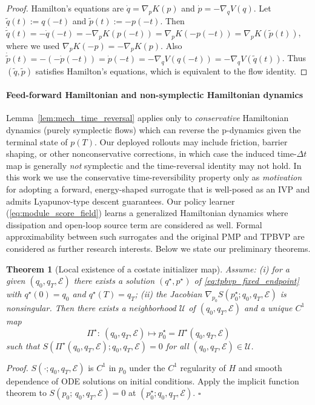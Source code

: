 \documentclass{article} %
\newtheorem{theorem}{Theorem}[section]     %
\begin{document}
\begin{proof}
Hamilton's equations are $\dot q=\nabla_p K(p)$ and $\dot p=-\nabla_q V(q)$.
Let $\tilde q(t):=q(-t)$ and $\tilde p(t):=-p(-t)$.
Then $\dot{\tilde q}(t)=-\dot q(-t)=-\nabla_p K(p(-t))=\nabla_p K(-p(-t))=\nabla_p K(\tilde p(t))$,
where we used $\nabla_p K(-p)=-\nabla_p K(p)$.
Also $\dot{\tilde p}(t)=-(-\dot p(-t))=\dot p(-t)=-\nabla_q V(q(-t))=-\nabla_q V(\tilde q(t))$. Thus $(\tilde q,\tilde p)$ satisfies Hamilton's equations, which is equivalent to the flow identity.
\end{proof}

\paragraph{ Feed-forward Hamiltonian and non-symplectic Hamiltonian dynamics}
Lemma~\ref{lem:mech_time_reversal} applies only to \emph{conservative} Hamiltonian dynamics (purely symplectic flows) which can reverse the p-dynamics given the terminal state of $p(T)$. Our deployed rollouts may include friction, barrier shaping, or other nonconservative corrections, in which case the induced
time-$\Delta t$ map is generally \emph{not} symplectic and the time-reversal identity may not hold.
In this work we use the conservative time-reversibility property only as \emph{motivation} for adopting a forward,
energy-shaped surrogate that is well-posed as an IVP and admits
Lyapunov-type descent guarantees. Our policy learner (\cref{eq:module_score_field}) learns a generalized Hamiltonian dynamics where dissipation and open-loop source term are considered as well. Formal approximability between such surrogates and the original PMP and TPBVP are considered as further research interests. Below we state our preliminary theorems.

\begin{theorem}[Local existence of a costate initializer map]
\label{thm:ift_costate}
Assume: (i) for a given $(q_0,q_T,\mathcal E)$ there exists a solution $(q^\star,p^\star)$ of \cref{eq:tpbvp_fixed_endpoint}
with $q^\star(0)=q_0$ and $q^\star(T)=q_T$;
(ii) the Jacobian $\nabla_{p_0}S(p_0^\star;q_0,q_T,\mathcal E)$ is nonsingular.
Then there exists a neighborhood $\mathcal U$ of $(q_0,q_T,\mathcal E)$ and a unique $C^1$ map
\[
\Pi^\star:\ (q_0,q_T,\mathcal E)\mapsto p_0^\star=\Pi^\star(q_0,q_T,\mathcal E)
\]
such that $S(\Pi^\star(q_0,q_T,\mathcal E);q_0,q_T,\mathcal E)=0$ for all $(q_0,q_T,\mathcal E)\in\mathcal U$.
\end{theorem}
\emph{Proof.} $S(\cdot;q_0,q_T,\mathcal E)$ is $C^1$ in $p_0$ under the $C^1$ regularity of $H$ and smooth dependence of ODE solutions on initial conditions.
Apply the implicit function theorem to $S(p_0;\,q_0,q_T,\mathcal E)=0$ at $(p_0^\star;q_0,q_T,\mathcal E)$. $\square$
\end{document}
